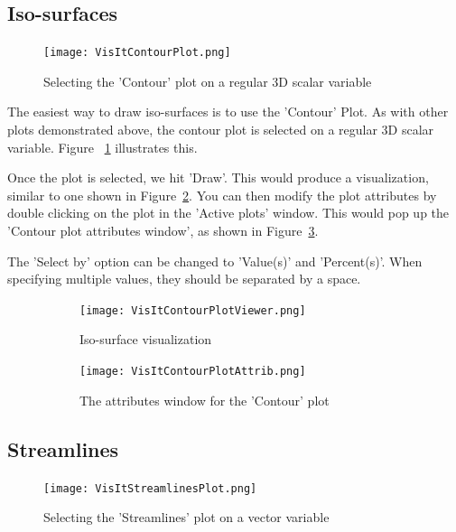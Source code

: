 \subsection{Iso-surfaces}

\begin{figure}
  \vspace{-20pt}
  \centering
  \texttt{[image: VisItContourPlot.png]}
  \caption{Selecting the 'Contour' plot on a regular 3D scalar variable}
  \label{VisItContourPlot}
\end{figure}

The easiest way to draw iso-surfaces is to use the 'Contour' Plot. As
with other plots demonstrated above, the contour plot is selected on a
regular 3D scalar variable. Figure ~\ref{VisItContourPlot} illustrates
this.

Once the plot is selected, we hit 'Draw'. This would produce a
visualization, similar to one shown in
Figure~\ref{VisItContourPlotViewer}. You can then modify the plot
attributes by double clicking on the plot in the 'Active plots'
window. This would pop up the 'Contour plot attributes window', as
shown in Figure~\ref{VisItContourPlotAttrib}.

The 'Select by' option can be changed to 'Value(s)' and
'Percent(s)'. When specifying multiple values, they should be
separated by a space.

\begin{figure}[htb]
  \centering
  \begin{subfigure}[b]{0.45\textwidth}
    \centering
    \texttt{[image: VisItContourPlotViewer.png]}
    \caption{Iso-surface visualization}
    \label{VisItContourPlotViewer}
  \end{subfigure}
  \begin{subfigure}[b]{0.45\textwidth}
    \centering
    \texttt{[image: VisItContourPlotAttrib.png]}
    \caption{The attributes window for the 'Contour' plot}
    \label{VisItContourPlotAttrib}
  \end{subfigure}
  \caption{}
  \label{ucf.fig9}
\end{figure}

\clearpage

\subsection{Streamlines}

\begin{figure}
  \vspace{-20pt}
  \centering
  \texttt{[image: VisItStreamlinesPlot.png]}
  \caption{Selecting the 'Streamlines' plot on a vector variable}
  \label{VisItStreamlinesPlot}
\end{figure}

